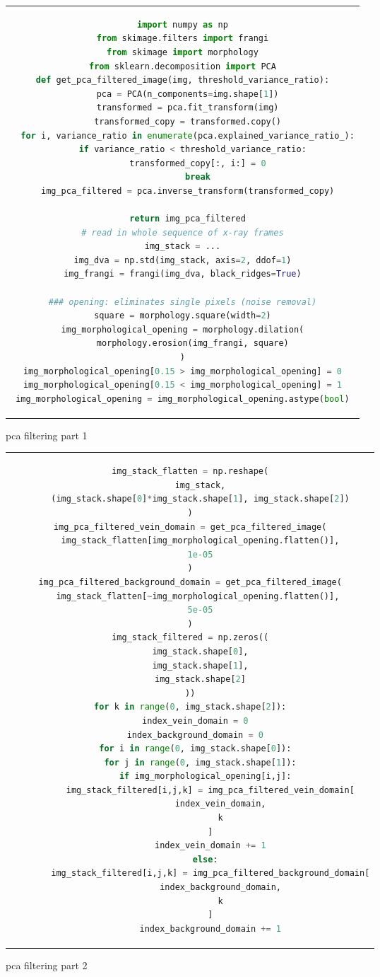 \begin{figure}[htpb]
	\begin{tabular}{c}
	\begin{lstlisting}[language=Python]
import numpy as np
from skimage.filters import frangi
from skimage import morphology
from sklearn.decomposition import PCA
def get_pca_filtered_image(img, threshold_variance_ratio):
  pca = PCA(n_components=img.shape[1])
  transformed = pca.fit_transform(img)
  transformed_copy = transformed.copy()
  for i, variance_ratio in enumerate(pca.explained_variance_ratio_):
    if variance_ratio < threshold_variance_ratio:
      transformed_copy[:, i:] = 0
      break
  img_pca_filtered = pca.inverse_transform(transformed_copy)

  return img_pca_filtered
# read in whole sequence of x-ray frames
img_stack = ...
img_dva = np.std(img_stack, axis=2, ddof=1)
img_frangi = frangi(img_dva, black_ridges=True)

### opening: eliminates single pixels (noise removal)
square = morphology.square(width=2)
img_morphological_opening = morphology.dilation(
	morphology.erosion(img_frangi, square)
)
img_morphological_opening[0.15 > img_morphological_opening] = 0
img_morphological_opening[0.15 < img_morphological_opening] = 1
img_morphological_opening = img_morphological_opening.astype(bool)
	\end{lstlisting}
	\end{tabular}
	\caption[Example listing]{\gls{pca} filtering part 1}
\label{code:pca1}
\end{figure}

\begin{figure}[htpb]
	\begin{tabular}{c}
	\begin{lstlisting}[language=Python]
img_stack_flatten = np.reshape(
	img_stack,
	(img_stack.shape[0]*img_stack.shape[1], img_stack.shape[2])
)
img_pca_filtered_vein_domain = get_pca_filtered_image(
	img_stack_flatten[img_morphological_opening.flatten()],
	1e-05
)
img_pca_filtered_background_domain = get_pca_filtered_image(
	img_stack_flatten[~img_morphological_opening.flatten()], 
	5e-05
)
img_stack_filtered = np.zeros((
	img_stack.shape[0],
	img_stack.shape[1],
	img_stack.shape[2]
))
for k in range(0, img_stack.shape[2]):
  index_vein_domain = 0
  index_background_domain = 0
  for i in range(0, img_stack.shape[0]):
    for j in range(0, img_stack.shape[1]):
      if img_morphological_opening[i,j]:
        img_stack_filtered[i,j,k] = img_pca_filtered_vein_domain[
			index_vein_domain,
			k
		]
        index_vein_domain += 1
      else:
        img_stack_filtered[i,j,k] = img_pca_filtered_background_domain[
			index_background_domain,
			k
		]
        index_background_domain += 1
	\end{lstlisting}
	\end{tabular}
	\caption[Example listing]{\gls{pca} filtering part 2}
\label{code:pca2}
\end{figure}

